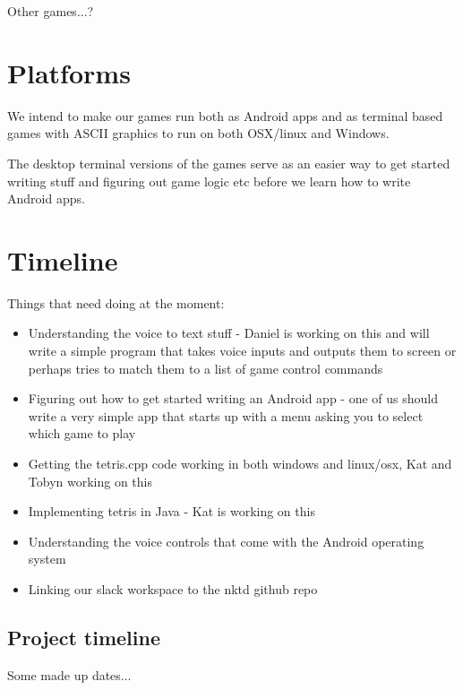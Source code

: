 \documentclass[11pt, oneside]{article}
\begin{document}
Other games...?

\section*{Platforms}

We intend to make our games run both as Android apps and as terminal
based games with ASCII graphics to run on both OSX/linux and Windows.

The desktop terminal versions of the games serve as an easier way to
get started writing stuff and figuring out game logic etc before we
learn how to write Android apps.


\section*{Timeline}

Things that need doing at the moment:
\begin{itemize}
\item Understanding the voice to text stuff - Daniel is working on
  this and will write a simple program that takes voice inputs and
  outputs them to screen or perhaps tries to match them to a list of
  game control commands
\item Figuring out how to get started writing an Android app - one of
  us should write a very simple app that starts up with a menu asking
  you to select which game to play
\item Getting the tetris.cpp code working in both windows and
  linux/osx, Kat and Tobyn working on this
\item Implementing tetris in Java - Kat is working on this
\item Understanding the voice controls that come with the Android
  operating system
\item Linking our slack workspace to the nktd github repo
  
\end{itemize}

\subsection*{Project timeline}

Some made up dates...
\end{document}

